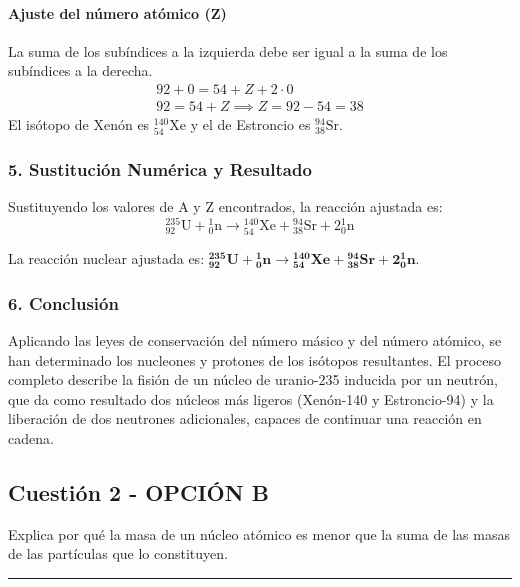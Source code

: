 \paragraph{Ajuste del número atómico (Z)}
La suma de los subíndices a la izquierda debe ser igual a la suma de los subíndices a la derecha.
\begin{gather}
    92 + 0 = 54 + Z + 2 \cdot 0 \\
    92 = 54 + Z \implies Z = 92 - 54 = 38
\end{gather}
El isótopo de Xenón es ${}^{140}_{54}\text{Xe}$ y el de Estroncio es ${}^{94}_{38}\text{Sr}$.

\subsubsection*{5. Sustitución Numérica y Resultado}
Sustituyendo los valores de A y Z encontrados, la reacción ajustada es:
$$ {}^{235}_{92}\text{U} + {}^{1}_{0}\text{n} \longrightarrow {}^{140}_{54}\text{Xe} + {}^{94}_{38}\text{Sr} + 2 {}^{1}_{0}\text{n} $$
\begin{cajaresultado}
La reacción nuclear ajustada es: $\boldsymbol{{}^{235}_{92}\textbf{U} + {}^{1}_{0}\textbf{n} \longrightarrow {}^{140}_{54}\textbf{Xe} + {}^{94}_{38}\textbf{Sr} + 2 {}^{1}_{0}\textbf{n}}$.
\end{cajaresultado}

\subsubsection*{6. Conclusión}
\begin{cajaconclusion}
Aplicando las leyes de conservación del número másico y del número atómico, se han determinado los nucleones y protones de los isótopos resultantes. El proceso completo describe la fisión de un núcleo de uranio-235 inducida por un neutrón, que da como resultado dos núcleos más ligeros (Xenón-140 y Estroncio-94) y la liberación de dos neutrones adicionales, capaces de continuar una reacción en cadena.
\end{cajaconclusion}

\newpage

\subsection{Cuestión 2 - OPCIÓN B}
\label{subsec:6B_2006_jun_ord}

\begin{cajaenunciado}
Explica por qué la masa de un núcleo atómico es menor que la suma de las masas de las partículas que lo constituyen.
\end{cajaenunciado}
\hrule

